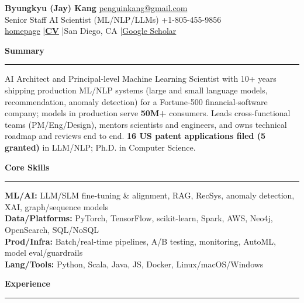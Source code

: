 \documentclass[10pt]{article}
\newcommand{\ressection}[1]{%
  \vspace{0.1em}%
  \textbf{#1}\\[-0.3em]%
  \rule{\linewidth}{0.3pt}%
  \vspace{0.1em}%
}
\begin{document}
{\LARGE \textbf{Byungkyu (Jay) Kang}} \hfill \href{mailto:penguinkang@gmail.com}{penguinkang@gmail.com}\\
Senior Staff AI Scientist (ML/NLP/LLMs) \hfill +1-805-455-9856 \\
\href{https://penguinkang.github.io/}{homepage} \quad|\quad \href{https://penguinkang.github.io/}{\textbf{CV}} \quad|\quad San Diego, CA \quad|\quad \href{https://scholar.google.com/citations?user=_PXCZLkAAAAJ}{Google Scholar}

\vspace{0.1em}

\ressection{Summary}
AI Architect and Principal-level Machine Learning Scientist with 10+ years shipping production ML/NLP systems (large and small language models, recommendation, anomaly detection) for a Fortune-500 financial-software company; models in production serve \textbf{50M+} consumers. Leads cross-functional teams (PM/Eng/Design), mentors scientists and engineers, and owns technical roadmap and reviews end to end. \textbf{16 US patent applications filed (5 granted)} in LLM/NLP; Ph.D. in Computer Science.

\ressection{Core Skills}
\textbf{ML/AI:} LLM/SLM fine-tuning \& alignment, RAG, RecSys, anomaly detection, XAI, graph/sequence models \\
\textbf{Data/Platforms:} PyTorch, TensorFlow, scikit-learn, Spark, AWS, Neo4j, OpenSearch, SQL/NoSQL \\
\textbf{Prod/Infra:} Batch/real-time pipelines, A/B testing, monitoring, AutoML, model eval/guardrails \\
\textbf{Lang/Tools:} Python, Scala, Java, JS, Docker, Linux/macOS/Windows

\ressection{Experience}
\end{document}
